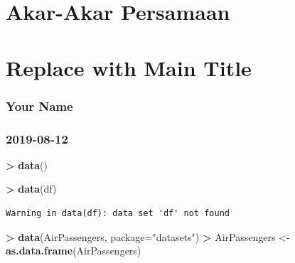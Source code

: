 \documentclass[]{book}
\newenvironment{Shaded}{\begin{snugshade}}{\end{snugshade}}
\newcommand{\DataTypeTok}[1]{\textcolor[rgb]{0.13,0.29,0.53}{#1}}
\newcommand{\KeywordTok}[1]{\textcolor[rgb]{0.13,0.29,0.53}{\textbf{#1}}}
\newcommand{\NormalTok}[1]{#1}
\newcommand{\OperatorTok}[1]{\textcolor[rgb]{0.81,0.36,0.00}{\textbf{#1}}}
\newcommand{\StringTok}[1]{\textcolor[rgb]{0.31,0.60,0.02}{#1}}
\theoremstyle{definition}
\theoremstyle{definition}
\theoremstyle{definition}
\theoremstyle{remark}
\begin{document}
\hypertarget{rootfinding}{%
\chapter{Akar-Akar Persamaan}\label{rootfinding}}

\hypertarget{replace-with-main-title}{%
\chapter{Replace with Main Title}\label{replace-with-main-title}}

\hypertarget{your-name}{%
\subsection{Your Name}\label{your-name}}

\hypertarget{section}{%
\subsection{2019-08-12}\label{section}}

\begin{Shaded}
\begin{Highlighting}[]
\OperatorTok{>}\StringTok{ }\KeywordTok{data}\NormalTok{()}
\end{Highlighting}
\end{Shaded}

\begin{Shaded}
\begin{Highlighting}[]
\OperatorTok{>}\StringTok{ }\KeywordTok{data}\NormalTok{(df)}
\end{Highlighting}
\end{Shaded}

\begin{verbatim}
Warning in data(df): data set 'df' not found
\end{verbatim}

\begin{Shaded}
\begin{Highlighting}[]
\OperatorTok{>}\StringTok{ }\KeywordTok{data}\NormalTok{(AirPassengers, }\DataTypeTok{package=}\StringTok{"datasets"}\NormalTok{)}
\OperatorTok{>}\StringTok{ }\NormalTok{AirPassengers <-}\StringTok{ }\KeywordTok{as.data.frame}\NormalTok{(AirPassengers)}
\end{Highlighting}
\end{Shaded}


\end{document}
